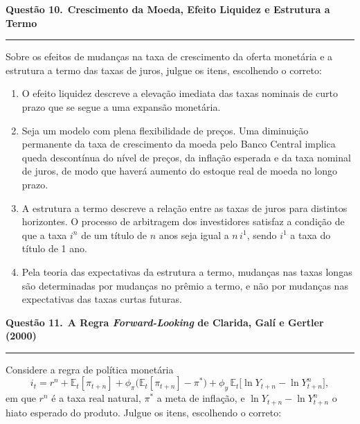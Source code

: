 \documentclass[12pt, a4paper]{article}
\newcommand{\E}{\mathbb{E}}
\newcommand{\provaquestao}[2]{%
  \par\vspace{0.9em}%
  {\large\bfseries\color{cyanrbc} Questão #1.}\ {\bfseries #2}\par
  \vspace{-0.45em}\rule{\linewidth}{0.4pt}\par\vspace{0.1em}}
\begin{document}
\provaquestao{10}{Crescimento da Moeda, Efeito Liquidez e Estrutura a Termo}

Sobre os efeitos de mudanças na taxa de crescimento da oferta monetária e a
estrutura a termo das taxas de juros, julgue os itens, escolhendo o correto:

\begin{enumerate}[label=\alph*)]
\item O efeito liquidez descreve a elevação imediata das taxas nominais de
curto prazo que se segue a uma expansão monetária.
\item Seja um modelo com plena flexibilidade de preços. Uma diminuição
permanente da taxa de crescimento da moeda pelo Banco Central implica queda
descontínua do nível de preços, da inflação esperada e da taxa nominal de
juros, de modo que haverá aumento do estoque real de moeda no longo prazo.
\item A estrutura a termo descreve a relação entre as taxas de juros para
distintos horizontes. O processo de arbitragem dos investidores satisfaz a
condição de que a taxa $i^n$ de um título de $n$ anos seja igual a $n\,i^1$,
sendo $i^1$ a taxa do título de 1 ano.
\item Pela teoria das expectativas da estrutura a termo, mudanças nas taxas
longas são determinadas por mudanças no prêmio a termo, e não por mudanças nas
expectativas das taxas curtas futuras.
\end{enumerate}

\provaquestao{11}{A Regra \emph{Forward-Looking} de Clarida, Galí e Gertler (2000)}

Considere a regra de política monetária
\[
i_t = r^n + \E_t[\pi_{t+n}]
      + \phi_\pi\bigl(\E_t[\pi_{t+n}] - \pi^*\bigr)
      + \phi_y\,\E_t\bigl[\ln Y_{t+n} - \ln Y^n_{t+n}\bigr],
\]
em que $r^n$ é a taxa real natural, $\pi^*$ a meta de inflação, e
$\ln Y_{t+n} - \ln Y^n_{t+n}$ o hiato esperado do produto. Julgue os itens,
escolhendo o correto:
\end{document}
